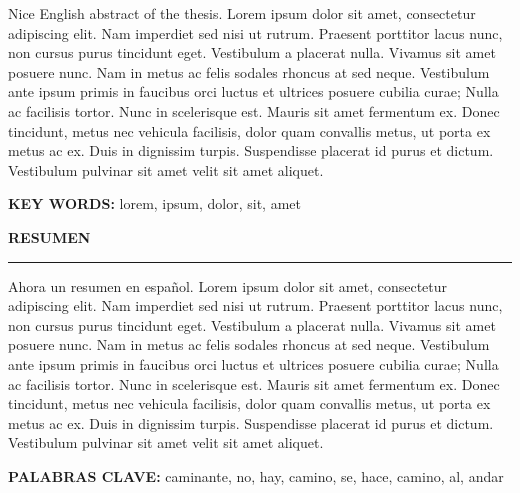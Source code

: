 Nice English abstract of the thesis. Lorem ipsum dolor sit amet, consectetur adipiscing elit. Nam imperdiet sed nisi ut rutrum. Praesent porttitor lacus nunc, non cursus purus tincidunt eget. Vestibulum a placerat nulla. Vivamus sit amet posuere nunc. Nam in metus ac felis sodales rhoncus at sed neque. Vestibulum ante ipsum primis in faucibus orci luctus et ultrices posuere cubilia curae; Nulla ac facilisis tortor. Nunc in scelerisque est. Mauris sit amet fermentum ex. Donec tincidunt, metus nec vehicula facilisis, dolor quam convallis metus, ut porta ex metus ac ex. Duis in dignissim turpis. Suspendisse placerat id purus et dictum. Vestibulum pulvinar sit amet velit sit amet aliquet.


\vspace{2cm}
\noindent \textbf{KEY WORDS:} lorem, ipsum, dolor, sit, amet\\[3mm]


\pagebreak[1] \vfill \clearpage \thispagestyle{empty} \quad
\thispagestyle{empty}
\thispagestyle{empty}
\begin{center}
	\textbf{\large RESUMEN} \\
	\noindent\rule{10cm}{0.8pt}
\end{center}

Ahora un resumen en español. Lorem ipsum dolor sit amet, consectetur adipiscing elit. Nam imperdiet sed nisi ut rutrum. Praesent porttitor lacus nunc, non cursus purus tincidunt eget. Vestibulum a placerat nulla. Vivamus sit amet posuere nunc. Nam in metus ac felis sodales rhoncus at sed neque. Vestibulum ante ipsum primis in faucibus orci luctus et ultrices posuere cubilia curae; Nulla ac facilisis tortor. Nunc in scelerisque est. Mauris sit amet fermentum ex. Donec tincidunt, metus nec vehicula facilisis, dolor quam convallis metus, ut porta ex metus ac ex. Duis in dignissim turpis. Suspendisse placerat id purus et dictum. Vestibulum pulvinar sit amet velit sit amet aliquet.


\vspace{2cm}
\noindent \textbf{PALABRAS CLAVE:} caminante, no, hay, camino, se, hace, camino, al, andar\\[3mm]


\clearpage
